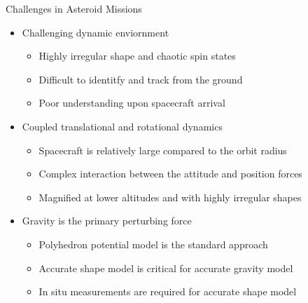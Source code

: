 \documentclass[11pt,professionalfonts]{beamer}
\begin{document}
\begin{frame}{Challenges in Asteroid Missions}
    \begin{itemize}
        \item<1->  Challenging dynamic enviornment
            \begin{itemize}
                \item<1-> Highly irregular shape and chaotic spin states
                \item<1-> Difficult to identitfy and track from the ground
                \item<1-> Poor understanding upon spacecraft arrival
            \end{itemize}
        \item<2-> Coupled translational and rotational dynamics
            \begin{itemize}
                \item Spacecraft is relatively large compared to the orbit radius
                \item Complex interaction between the attitude and position forces
                \item Magnified at lower altitudes and with highly irregular shapes
            \end{itemize}
        \item<3-> Gravity is the primary perturbing force
            \begin{itemize}
                \item Polyhedron potential model is the standard approach 
                \item Accurate shape model is critical for accurate gravity model
                \item In situ measurements are required for accurate shape model
            \end{itemize}
    \end{itemize}
   
\end{frame}
\end{document}
